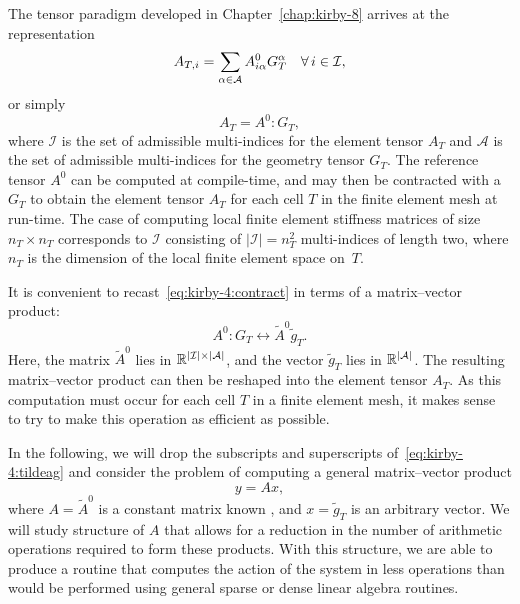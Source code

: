 The tensor paradigm developed in Chapter~\ref{chap:kirby-8} arrives at
the representation
\begin{equation}
  A_{T,i} = \sum_{\alpha\in\mathcal{A}} A^0_{i\alpha} G_T^{\alpha}
  \quad \forall\, i \in \mathcal{I},
\end{equation}
or simply
\begin{equation} \label{eq:kirby-4:contract}
  A_T = A^0 : G_T,
\end{equation}
where $\mathcal{I}$ is the set of admissible multi-indices for the element
tensor $A_T$ and $\mathcal{A}$ is the set of admissible multi-indices
for the geometry tensor $G_T$. The reference tensor $ A^0 $ can be
computed at compile-time, and may then be contracted with a $ G_T $ to
obtain the element tensor $A_T$ for each cell $T$ in the finite element
mesh at run-time. The case of computing local finite element stiffness
matrices of size $n_T \times n_T$ corresponds to $\mathcal{I}$ consisting
of $|\mathcal{I}| = n_T^2$ multi-indices of length two, where $n_T$
is the dimension of the local finite element space on~$T$.

It is convenient to recast~\eqref{eq:kirby-4:contract} in terms of a
matrix--vector product:
\begin{equation} \label{eq:kirby-4:tildeag}
  A^0 : G_T \leftrightarrow \tilde{A}^0 \tilde{g}_T.
\end{equation}
Here, the matrix $ \tilde{A}^0 $ lies in $ \mathbb{R}^{|\mathcal{I}| \times
  |\mathcal{A}|} $, and the vector $ \tilde{g}_{T} $ lies in $
\mathbb{R}^{|\mathcal{A}|} $. The resulting matrix--vector product can
then be reshaped into the element tensor $A_T$. As this computation
must occur for each cell $T$ in a finite element mesh, it makes
sense to try to make this operation as efficient as possible.

In the following, we will drop the subscripts and superscripts
of~\eqref{eq:kirby-4:tildeag} and consider the problem of computing a
general matrix--vector product
\begin{equation}
y = A x,
\end{equation}
where $ A = \tilde{A}^0 $ is a constant matrix
known \apriori{}, and $x = \tilde{g}_T$ is an arbitrary vector. We
will study structure of $ A $ that allows for a reduction in the
number of arithmetic operations required to form these products. With
this structure, we are able to produce a routine that computes the
action of the system in less operations than would be performed using
general sparse or dense linear algebra routines.


